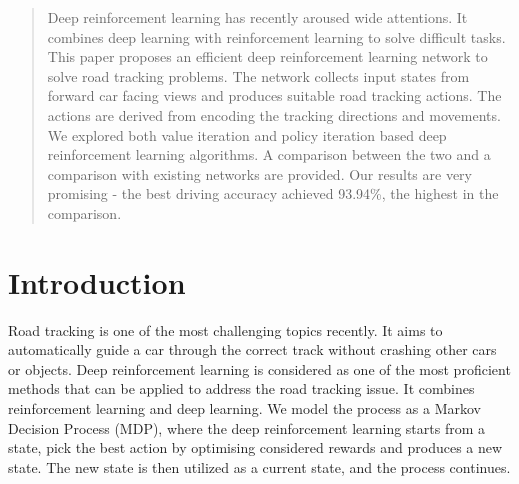 \documentclass[conference]{IEEEtran}
\begin{document}




\maketitle

\begin{abstract}
Deep reinforcement learning has recently aroused wide attentions. It combines deep learning with reinforcement learning to solve difficult tasks. This paper proposes an efficient deep reinforcement learning network to solve road tracking problems. The network collects input states from forward car facing views and produces suitable road tracking actions. The actions are derived from encoding the tracking directions and movements. We explored both value iteration and policy iteration based deep reinforcement learning algorithms. A comparison between the two and a comparison with existing networks are provided. Our results are very promising - the best driving accuracy achieved 93.94\%, the highest in the comparison. 
\end{abstract}





%
\IEEEpeerreviewmaketitle



\section{Introduction}
	Road tracking is one of the most challenging topics recently. It aims to automatically guide a car through the correct track without crashing other cars or objects. Deep reinforcement learning is considered as one of the most proficient methods that can be applied to address the road tracking issue. It combines reinforcement learning and deep learning. We model the process as a Markov Decision Process (MDP), where the deep reinforcement learning starts from a state, pick the best action by optimising considered rewards and produces a new state. The new state is then utilized as a current state, and the process continues.  
\end{document}
